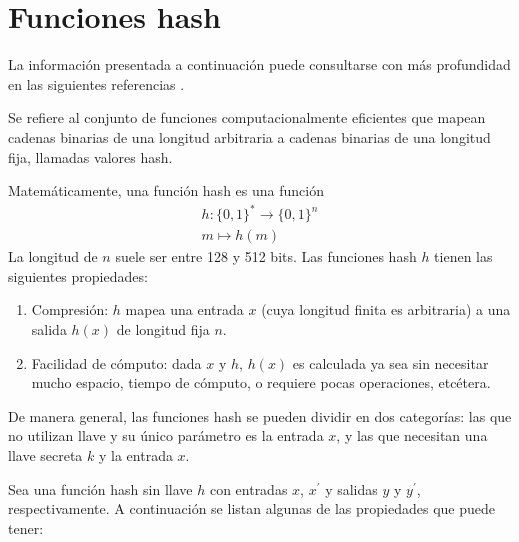 %
%

\section{Funciones hash}
\label{sec:hash}

La información presentada a continuación puede consultarse con más profundidad
en las siguientes referencias
\cite{hash_hussein, menezes, DBLP:series/isc/DelfsK07, hash_gupta}.

Se refiere al conjunto de funciones computacionalmente eficientes que
mapean cadenas binarias de una longitud arbitraria a cadenas binarias
de una longitud fija, llamadas valores hash.

Matemáticamente, una función hash es una función
\begin{equation}
  \label{funcion_hash_def}
  \begin{split}
    h: \{0, 1\}^* \longrightarrow \{0,1\}^n \\
    m \longmapsto h(m)
  \end{split}
\end{equation}
La longitud de $n$ suele ser entre 128 y 512 bits. Las funciones hash
$h$ tienen las siguientes propiedades:

\begin{enumerate}
  \item Compresión: $h$ mapea una entrada $x$ (cuya longitud
    finita es arbitraria) a una salida $h(x)$ de longitud fija $n$.
  \item Facilidad de cómputo: dada $x$ y $h$, $h(x)$ es
    calculada ya sea sin necesitar mucho espacio, tiempo de cómputo, o
    requiere pocas operaciones, etcétera.
\end{enumerate}

De manera general, las funciones hash se pueden dividir en dos
categorías: las que no utilizan llave y su único parámetro es la entrada
$x$, y las que necesitan una llave secreta $k$ y la entrada $x$.

Sea una función hash sin llave $h$ con entradas $x$, $x^\prime$ y
salidas $y$ y $y^\prime$, respectivamente. A continuación se listan
algunas de las propiedades que puede tener:

